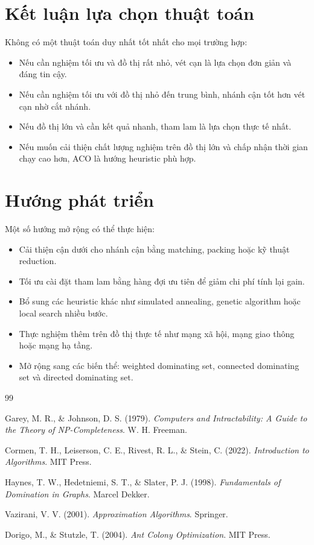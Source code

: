 \documentclass[12pt, a4paper]{report}
\begin{document}
\section{Kết luận lựa chọn thuật toán}

Không có một thuật toán duy nhất tốt nhất cho mọi trường hợp:

\begin{itemize}
  \item Nếu cần nghiệm tối ưu và đồ thị rất nhỏ, vét cạn là lựa chọn đơn giản và đáng tin cậy.
  \item Nếu cần nghiệm tối ưu với đồ thị nhỏ đến trung bình, nhánh cận tốt hơn vét cạn nhờ cắt nhánh.
  \item Nếu đồ thị lớn và cần kết quả nhanh, tham lam là lựa chọn thực tế nhất.
  \item Nếu muốn cải thiện chất lượng nghiệm trên đồ thị lớn và chấp nhận thời gian chạy cao hơn, ACO là
    hướng heuristic phù hợp.
\end{itemize}

\section{Hướng phát triển}

Một số hướng mở rộng có thể thực hiện:

\begin{itemize}
  \item Cải thiện cận dưới cho nhánh cận bằng matching, packing hoặc kỹ thuật reduction.
  \item Tối ưu cài đặt tham lam bằng hàng đợi ưu tiên để giảm chi phí tính lại gain.
  \item Bổ sung các heuristic khác như simulated annealing, genetic algorithm hoặc local search nhiều
    bước.
  \item Thực nghiệm thêm trên đồ thị thực tế như mạng xã hội, mạng giao thông hoặc mạng hạ tầng.
  \item Mở rộng sang các biến thể: weighted dominating set, connected dominating set và directed
    dominating set.
\end{itemize}

\begin{thebibliography}{99}

Garey, M. R., \& Johnson, D. S. (1979).
\textit{Computers and Intractability: A Guide to the Theory of NP-Completeness}.
W. H. Freeman.

Cormen, T. H., Leiserson, C. E., Rivest, R. L., \& Stein, C. (2022).
\textit{Introduction to Algorithms}.
MIT Press.

Haynes, T. W., Hedetniemi, S. T., \& Slater, P. J. (1998).
\textit{Fundamentals of Domination in Graphs}.
Marcel Dekker.

Vazirani, V. V. (2001).
\textit{Approximation Algorithms}.
Springer.

Dorigo, M., \& Stutzle, T. (2004).
\textit{Ant Colony Optimization}.
MIT Press.

\end{thebibliography}
\end{document}
